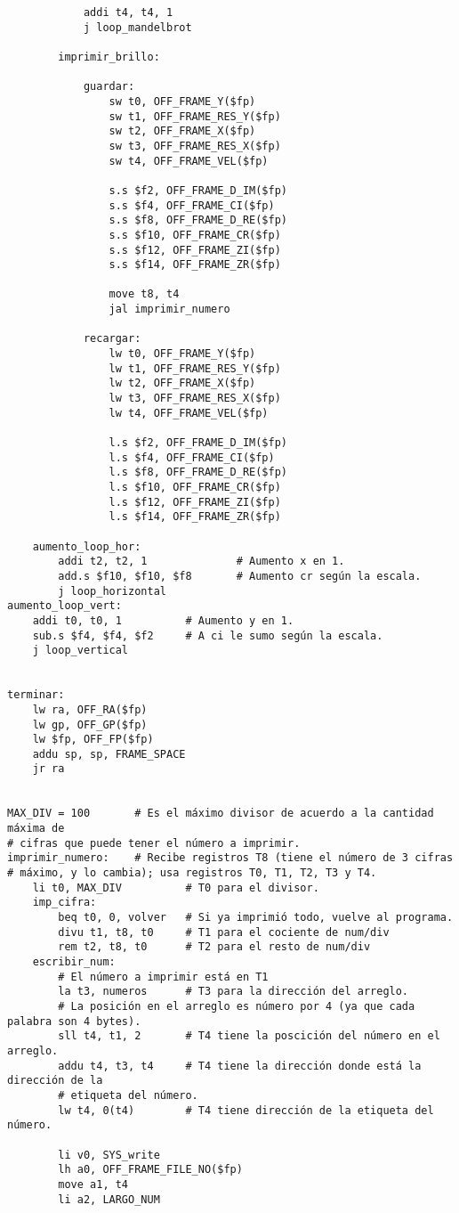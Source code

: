 \documentclass[a4paper,10pt]{article}
\begin{document}
\begin{verbatim}
			addi t4, t4, 1
			j loop_mandelbrot

		imprimir_brillo:

			guardar:	
				sw t0, OFF_FRAME_Y($fp)
				sw t1, OFF_FRAME_RES_Y($fp)
				sw t2, OFF_FRAME_X($fp)
				sw t3, OFF_FRAME_RES_X($fp)
				sw t4, OFF_FRAME_VEL($fp)
				
				s.s $f2, OFF_FRAME_D_IM($fp)
				s.s $f4, OFF_FRAME_CI($fp)
				s.s $f8, OFF_FRAME_D_RE($fp)
				s.s $f10, OFF_FRAME_CR($fp)
				s.s $f12, OFF_FRAME_ZI($fp)
				s.s $f14, OFF_FRAME_ZR($fp)						
				
				move t8, t4
				jal imprimir_numero
			
			recargar:
				lw t0, OFF_FRAME_Y($fp)
				lw t1, OFF_FRAME_RES_Y($fp)
				lw t2, OFF_FRAME_X($fp)
				lw t3, OFF_FRAME_RES_X($fp)
				lw t4, OFF_FRAME_VEL($fp)
				
				l.s $f2, OFF_FRAME_D_IM($fp)
				l.s $f4, OFF_FRAME_CI($fp)
				l.s $f8, OFF_FRAME_D_RE($fp)
				l.s $f10, OFF_FRAME_CR($fp)
				l.s $f12, OFF_FRAME_ZI($fp)
				l.s $f14, OFF_FRAME_ZR($fp)

	aumento_loop_hor:
		addi t2, t2, 1 				# Aumento x en 1.
		add.s $f10, $f10, $f8 		# Aumento cr según la escala.
		j loop_horizontal
aumento_loop_vert:
	addi t0, t0, 1 			# Aumento y en 1.
	sub.s $f4, $f4, $f2 	# A ci le sumo según la escala.
	j loop_vertical


terminar:
	lw ra, OFF_RA($fp)
	lw gp, OFF_GP($fp)
	lw $fp, OFF_FP($fp)
	addu sp, sp, FRAME_SPACE
	jr ra

	
MAX_DIV = 100		# Es el máximo divisor de acuerdo a la cantidad máxima de 
# cifras que puede tener el número a imprimir.
imprimir_numero:	# Recibe registros T8 (tiene el número de 3 cifras 
# máximo, y lo cambia); usa registros T0, T1, T2, T3 y T4.
	li t0, MAX_DIV			# T0 para el divisor.
	imp_cifra:
		beq t0, 0, volver	# Si ya imprimió todo, vuelve al programa.
		divu t1, t8, t0		# T1 para el cociente de num/div
		rem t2, t8, t0		# T2 para el resto de num/div
	escribir_num:
		# El número a imprimir está en T1
		la t3, numeros		# T3 para la dirección del arreglo.
		# La posición en el arreglo es número por 4 (ya que cada palabra son 4 bytes).
		sll t4, t1, 2		# T4 tiene la poscición del número en el arreglo.
		addu t4, t3, t4		# T4 tiene la dirección donde está la dirección de la 
		# etiqueta del número.
		lw t4, 0(t4)		# T4 tiene dirección de la etiqueta del número.
		
		li v0, SYS_write
		lh a0, OFF_FRAME_FILE_NO($fp)
		move a1, t4
		li a2, LARGO_NUM
		

\end{verbatim}
\end{document}
